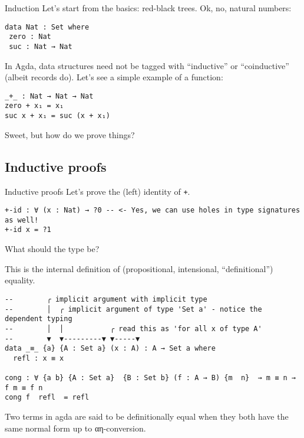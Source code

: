 \documentclass[t,aspectratio=169,9pt]{beamer}
\begin{document}
\begin{frame}{Induction}
  Let's start from the basics: red-black trees. Ok, no, natural numbers:
\begin{verbatim}
data Nat : Set where
 zero : Nat
 suc : Nat → Nat
\end{verbatim}
  In Agda, data structures need not be tagged with ``inductive'' or
  ``coinductive'' (albeit records do).
  Let's see a simple example of a function:
\begin{verbatim}
_+_ : Nat → Nat → Nat
zero + x₁ = x₁
suc x + x₁ = suc (x + x₁)
\end{verbatim}
  Sweet, but how do we prove things?
\end{frame}

\subsection[induction]{Inductive proofs}
\begin{frame}[fragile]{Inductive proofs}
  Let's prove the (left) identity of \texttt{+}.
\begin{verbatim}
+-id : ∀ (x : Nat) → ?0 -- <- Yes, we can use holes in type signatures as well!
+-id x = ?1
\end{verbatim}
What should the type be?

This is the internal definition of (propositional, intensional, ``definitional'') equality.
\begin{verbatim}
--        ╭ implicit argument with implicit type
--        │  ╭ implicit argument of type 'Set a' - notice the dependent typing
--        │  │           ╭ read this as 'for all x of type A'
--        ▼  ▼---------▼ ▼-----▼
data _≡_ {a} {A : Set a} (x : A) : A → Set a where
  refl : x ≡ x

cong : ∀ {a b} {A : Set a}  {B : Set b} (f : A → B) {m  n}  → m ≡ n → f m ≡ f n
cong f  refl  = refl
\end{verbatim}
Two terms in agda are said to be definitionally equal when they both have the
same normal form up to αη-conversion.
\end{frame}
\end{document}
